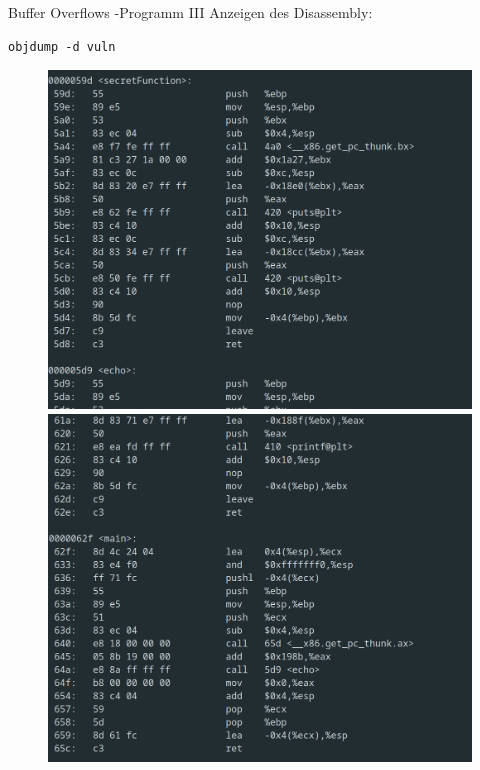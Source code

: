 \documentclass[10pt]{beamer}
\begin{document}
\begin{frame}[fragile]{Buffer Overflows -Programm III}
  Anzeigen des Disassembly:
  \begin{lstlisting}[style=BashStyle]
  objdump -d vuln
  \end{lstlisting}
  \begin{figure}%
   \centering
   {\includegraphics[scale=0.1]{buf_c_1}}%
   \quad
   {\includegraphics[scale=0.1]{buf_c_2}}%
  \end{figure}
\end{frame}
\end{document}

